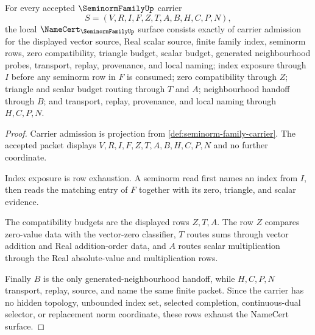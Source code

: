 \begin{theorem}
\label{thm:seminorm-family-namecert-obligations}
For every accepted $\SeminormFamilyUp$ carrier
$$
S=(V,R,I,F,Z,T,A,B,H,C,P,N),
$$
the local $\NameCert_{\SeminormFamilyUp}$ surface consists exactly of carrier admission for the displayed vector source, Real scalar source, finite family index, seminorm rows, zero compatibility, triangle budget, scalar budget, generated neighbourhood probes, transport, replay, provenance, and local naming; index exposure through $I$ before any seminorm row in $F$ is consumed; zero compatibility through $Z$; triangle and scalar budget routing through $T$ and $A$; neighbourhood handoff through $B$; and transport, replay, provenance, and local naming through $H,C,P,N$.
\end{theorem}
\begin{proof}
Carrier admission is projection from \autoref{def:seminorm-family-carrier}. The accepted packet displays $V,R,I,F,Z,T,A,B,H,C,P,N$ and no further coordinate.

Index exposure is row exhaustion. A seminorm read first names an index from $I$, then reads the matching entry of $F$ together with its zero, triangle, and scalar evidence.

The compatibility budgets are the displayed rows $Z,T,A$. The row $Z$ compares zero-value data with the vector-zero classifier, $T$ routes sums through vector addition and Real addition-order data, and $A$ routes scalar multiplication through the Real absolute-value and multiplication rows.

Finally $B$ is the only generated-neighbourhood handoff, while $H,C,P,N$ transport, replay, source, and name the same finite packet. Since the carrier has no hidden topology, unbounded index set, selected completion, continuous-dual selector, or replacement norm coordinate, these rows exhaust the NameCert surface.
\end{proof}

